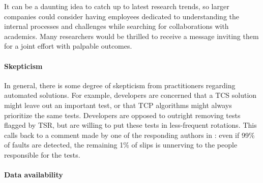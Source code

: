 It can be a daunting idea to catch up to latest research trends, so larger companies could consider having employees dedicated to understanding the internal processes and challenges while searching for collaborations with academics.
Many researchers would be thrilled to receive a message inviting them for a joint effort with palpable outcomes.

\paragraph{Skepticism}
In general, there is some degree of skepticism from practitioners regarding automated solutions.
For example, developers are concerned that a TCS solution might leave out an important test, or that TCP algorithms might always prioritize the same tests.
Developers are opposed to outright removing tests flagged by TSR, but are willing to put these tests in less-frequent rotations.
This calls back to a comment made by one of the responding authors in : even if 99\% of faults are detected, the remaining 1\% of slips is unnerving to the people responsible for the tests.

\paragraph{Data availability}
